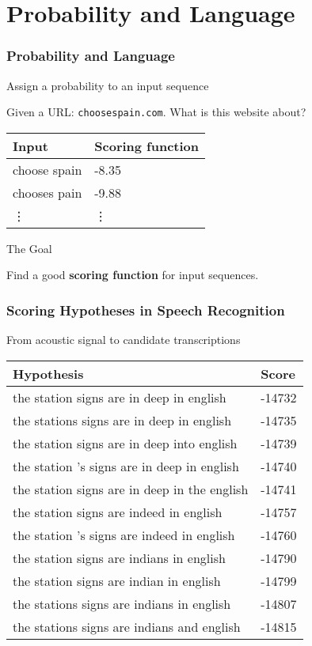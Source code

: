 




\section{Probability and Language}
\frame{\tableofcontents[currentsection]}

\begin{frame}
\frametitle{Probability and Language}
\centering
\begin{block}{Assign a probability to an input sequence}
\par Given a URL: \texttt{choosespain.com}. What is this website about?

\pause
\smallskip
\begin{tabular}{ll}
\rowcolor{MidnightBlue!50}
Input & Scoring function \\
\hline
choose spain & -8.35 \\
chooses pain & -9.88 \\
\vdots & \vdots
\end{tabular}
\end{block}

\pause
\begin{alertblock}{The Goal}
\par Find a good \textbf{scoring function} for input sequences.
\end{alertblock}
\end{frame}

\begin{frame}
\frametitle{Scoring Hypotheses in Speech Recognition}
\centering
\begin{block}{From acoustic signal to candidate transcriptions}
\begin{tabular}{ll}
\rowcolor{MidnightBlue!50}
Hypothesis & Score \\
\hline
the station signs are in deep in english & -14732 \\
the stations signs are in deep in english & -14735 \\
the station signs are in deep into english & -14739 \\
the station 's signs are in deep in english & -14740 \\
the station signs are in deep in the english & -14741 \\
the station signs are indeed in english & -14757 \\
the station 's signs are indeed in english & -14760 \\ 
the station signs are indians in english & -14790 \\
the station signs are indian in english & -14799 \\
the stations signs are indians in english & -14807 \\
the stations signs are indians and english & -14815 
\end{tabular}
\end{block}
\end{frame}

